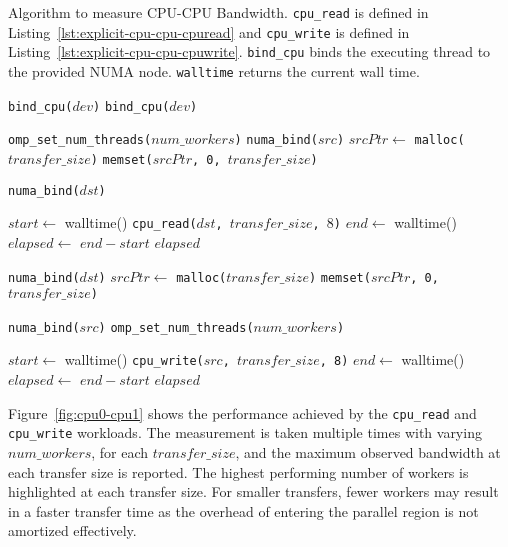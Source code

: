 \begin{algorithm}
	\caption[test]{
		Algorithm to measure CPU-CPU Bandwidth.
		\texttt{cpu\_read} is defined in Listing~\ref{lst:explicit-cpu-cpu-cpuread} and \texttt{cpu\_write} is defined in Listing~\ref{lst:explicit-cpu-cpu-cpuwrite}.
		\texttt{bind\_cpu} binds the executing thread to the provided NUMA node.
		\texttt{walltime} returns the current wall time.
	}
	\label{alg:explicit-cpu-cpu}
	\begin{algorithmic}[1]
		\Statex
        
        \State \texttt{bind\_cpu($dev$)}
        \State \texttt{bind\_cpu($dev$)}
        \EndFor
        \EndFunction

        \Statex
		\State \texttt{omp\_set\_num\_threads($num\_workers$)}
		\State \texttt{numa\_bind($src$)}
        \State $srcPtr \gets$ \texttt{malloc($transfer\_size$)}
        \State \texttt{memset($srcPtr$, 0, $transfer\_size$)}
		
		\State \texttt{numa\_bind($dst$)}
		\Statex

		\State $start \gets$ walltime()
		\State \texttt{cpu\_read($dst$, $transfer\_size$, $8$)}
		\State $end \gets$ walltime()
        \State $elapsed \gets$ $end-start$
		\State \Return $elapsed$
		\EndFunction
        
        \Statex
		\State \texttt{numa\_bind($dst$)}
		\State $srcPtr \gets$ \texttt{malloc($transfer\_size$)}
		\State \texttt{memset($srcPtr$, 0, $transfer\_size$)}
		
		\State \texttt{numa\_bind($src$)}
		\State \texttt{omp\_set\_num\_threads($num\_workers$)}
		\Statex
		
		\State $start \gets$ walltime()
		\State \texttt{cpu\_write($src$, $transfer\_size$, 8)}
		\State $end \gets$ walltime()
        \State $elapsed \gets$ $end-start$
		\State \Return $elapsed$
		\EndFunction
		
	\end{algorithmic}
\end{algorithm}


Figure~\ref{fig:cpu0-cpu1} shows the performance achieved by the \texttt{cpu\_read} and \texttt{cpu\_write} workloads.
The measurement is taken multiple times with varying $num\_workers$, for each $transfer\_size$, and the maximum observed bandwidth at each transfer size is reported.
The highest performing number of workers is highlighted at each transfer size.
For smaller transfers, fewer workers may result in a faster transfer time as the overhead of entering the parallel region is not amortized effectively.

